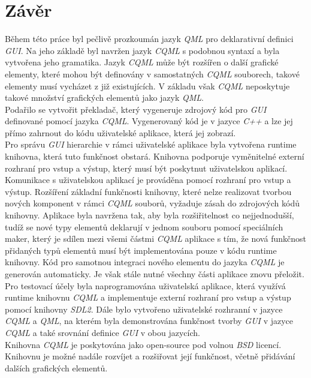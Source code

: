 \documentclass[11pt,twoside,a4paper]{book}
\begin{document}
\section{Závěr}
Během této práce byl pečlivě prozkoumán jazyk \textit{QML} pro deklarativní definici \textit{GUI}. Na jeho základě byl navržen jazyk \textit{CQML} s podobnou syntaxí a byla vytvořena jeho gramatika. Jazyk \textit{CQML} může být rozšířen o další grafické elementy, které mohou být definovány v samostatných \textit{CQML} souborech, takové elementy musí vycházet z již existujících. V základu však \textit{CQML} neposkytuje takové množství grafických elementů jako jazyk \textit{QML}.\\
Podařilo se vytvořit překladač, který vygeneruje zdrojový kód pro \textit{GUI} definované pomocí jazyka \textit{CQML}. Vygenerovaný kód je v jazyce \textit{C++} a lze jej přímo zahrnout do kódu uživatelské aplikace, která jej zobrazí.\\
Pro správu \textit{GUI} hierarchie v rámci uživatelské aplikace byla vytvořena runtime knihovna, která tuto funkčnost obstará. Knihovna podporuje vyměnitelné externí rozhraní pro vstup a výstup, který musí být poskytnut uživatelskou aplikací. Komunikace s uživatelskou aplikací je prováděna pomocí rozhraní pro vstup a výstup. 
Rozšíření základní funkčnosti knihovny, které nelze realizovat tvorbou nových komponent v rámci \textit{CQML} souborů, vyžaduje zásah do zdrojových kódů knihovny. Aplikace byla navržena tak, aby byla rozšiřitelnost co nejjednodušší, tudíž se nové typy elementů deklarují v jednom souboru pomocí speciálních maker, který je sdílen mezi všemi částmi \textit{CQML} aplikace s tím, že nová funkčnost přidaných typů elementů musí být implementována pouze v kódu runtime knihovny. Kód pro samotnou integraci nového elementu do jazyka \textit{CQML} je generován automaticky. Je však stále nutné všechny části aplikace znovu přeložit.\\
Pro testovací účely byla naprogramována uživatelská aplikace, která využívá runtime knihovnu \textit{CQML} a implementuje externí rozhraní pro vstup a výstup pomocí knihovny \textit{SDL2}. Dále bylo vytvořeno uživatelské rozhranní v jazyce \textit{CQML} a \textit{QML}, na kterém byla demonstrována funkčnost tvorby \textit{GUI} v jazyce \textit{CQML} a také srovnání definice \textit{GUI} v obou jazycích.\\
Knihovna \textit{CQML} je poskytována jako open-source pod volnou \textit{BSD} licencí. Knihovnu je možné nadále rozvíjet a rozšiřovat její funkčnost, včetně přidávání dalších grafických elementů.
\end{document}
